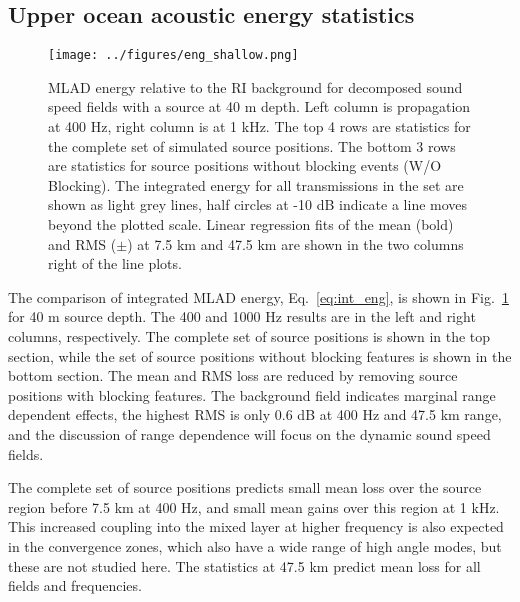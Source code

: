 \documentclass[preprint,NumberedRefs]{JASA}
\begin{document}
\subsection{Upper ocean acoustic energy statistics}\label{ssec:energy}
\begin{figure}
\texttt{[image: ../figures/eng\_shallow.png]}
    \caption{MLAD energy relative to the RI background for decomposed sound speed fields with a source at 40 m depth. Left column is propagation at 400 Hz, right column is at 1 kHz. The top 4 rows are statistics for the complete set of simulated source positions. The bottom 3 rows are statistics for source positions without blocking events (W/O Blocking). The integrated energy for all transmissions in the set are shown as light grey lines, half circles at -10 dB indicate a line moves beyond the plotted scale. Linear regression fits of the mean (bold) and RMS ($\pm$) at 7.5 km and 47.5 km are shown in the two columns right of the line plots.}
    \label{fig:shal_eng}
\end{figure}

The comparison of integrated MLAD energy, Eq.~\eqref{eq:int_eng}, is shown in Fig.~\ref{fig:shal_eng} for 40 m source depth. The 400 and 1000 Hz results are in the left and right columns, respectively. The complete set of source positions is shown in the top section, while the set of source positions without blocking features is shown in the bottom section. The mean and RMS loss are reduced by removing source positions with blocking features. The background field indicates marginal range dependent effects, the highest RMS is only 0.6 dB at 400 Hz and 47.5 km range, and the discussion of range dependence will focus on the dynamic sound speed fields.

The complete set of source positions predicts small mean loss over the source region before 7.5 km at 400 Hz, and small mean gains over this region at 1 kHz. This increased coupling into the mixed layer at higher frequency is also expected in the convergence zones, which also have a wide range of high angle modes, but these are not studied here. The statistics at 47.5 km predict mean loss for all fields and frequencies.
\end{document}
